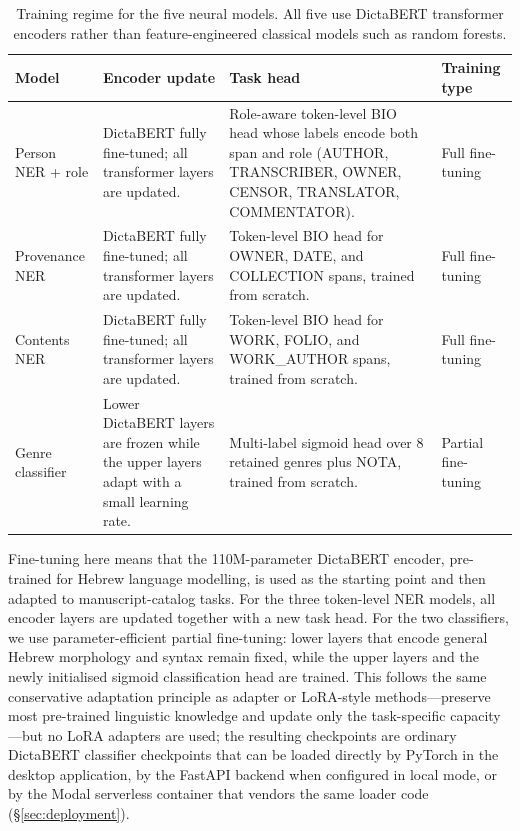 \documentclass[Afour,sageh,times]{sagej}
\begin{document}
\begin{table}[t]
\caption{Training regime for the five neural models. All five use DictaBERT transformer encoders rather than feature-engineered classical models such as random forests.}
\label{tab:model-training-regime}
\centering
\small
\begin{tabularx}{\textwidth}{p{}p{}p{}p{}}
\toprule
\textbf{Model} & \textbf{Encoder update} & \textbf{Task head} & \textbf{Training type} \\
\midrule
Person NER + role & DictaBERT fully fine-tuned; all transformer layers are updated. & Role-aware token-level BIO head whose labels encode both span and role (AUTHOR, TRANSCRIBER, OWNER, CENSOR, TRANSLATOR, COMMENTATOR). & Full fine-tuning \\
Provenance NER & DictaBERT fully fine-tuned; all transformer layers are updated. & Token-level BIO head for OWNER, DATE, and COLLECTION spans, trained from scratch. & Full fine-tuning \\
Contents NER & DictaBERT fully fine-tuned; all transformer layers are updated. & Token-level BIO head for WORK, FOLIO, and WORK\_AUTHOR spans, trained from scratch. & Full fine-tuning \\
Genre classifier & Lower DictaBERT layers are frozen while the upper layers adapt with a small learning rate. & Multi-label sigmoid head over 8 retained genres plus NOTA, trained from scratch. & Partial fine-tuning \\
\bottomrule
\end{tabularx}
\end{table}

Fine-tuning here means that the 110M-parameter DictaBERT encoder, pre-trained for Hebrew language modelling, is used as the starting point and then adapted to manuscript-catalog tasks. For the three token-level NER models, all encoder layers are updated together with a new task head. For the two classifiers, we use parameter-efficient partial fine-tuning: lower layers that encode general Hebrew morphology and syntax remain fixed, while the upper layers and the newly initialised sigmoid classification head are trained. This follows the same conservative adaptation principle as adapter or LoRA-style methods---preserve most pre-trained linguistic knowledge and update only the task-specific capacity---but no LoRA adapters are used; the resulting checkpoints are ordinary DictaBERT classifier checkpoints that can be loaded directly by PyTorch in the desktop application, by the FastAPI backend when configured in local mode, or by the Modal serverless container that vendors the same loader code (\S\ref{sec:deployment}).
\end{document}
